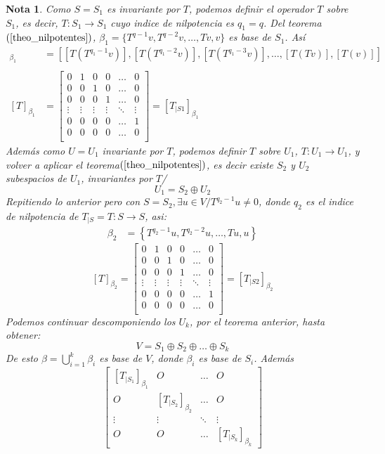 \documentclass[10pt,a4paper]{article}
\newtheorem{mynote}{Nota}
\begin{document}
\begin{mynote}
	Como $S = S_{1}$ es invariante por $T$, podemos definir el operador $T$ sobre $S_{1}$, es decir, $T:S_{1}\rightarrow S_{1}$ cuyo indice de nilpotencia es $q_{1} = q$.
Del teorema $(\ref{theo_nilpotentes})$, $\beta_{1} = \{T^{q-1}v, T^{q-2}v,\ldots,Tv, v\}$ es base de $S_{1}$.
Así 
\begin{align*}
	[T]_{\beta_{1}} &= 
	\left[
	\left[T\left(T^{q_{1}-1}v\right)\right], 
	\left[T\left(T^{q_{1}-2}v\right)\right],
	\left[T\left(T^{q_{1}-3}v\right)\right],
	\ldots,
	\left[T\left(Tv\right)\right],
	\left[T\left(v\right)\right]	
	\right]\\\\
	[T]_{\beta_{1}} &= 
	\begin{bmatrix}
		0	&	1	&	0	&	0	&	\ldots	&	0\\
		0	&	0	&	1	&	0	&	\ldots	&	0\\
		0	&	0	&	0	&	1	&	\ldots	&	0\\
		\vdots	&	\vdots	&	\vdots	&	\vdots	&	\ddots	&	\vdots\\
		0	&	0	&	0	&	0	&	\ldots	&	1\\
		0	&	0	&	0	&	0	&	\ldots	&	0\\
	\end{bmatrix} = [T_{|S1}]_{\beta_{1}}
\end{align*}
Además como $U = U_{1}$ invariante por $T$, podemos definir $T$ sobre $U_{1}$, $T: U_{1}\rightarrow U_{1}$, y volver a aplicar el \textit{teorema}$(\ref{theo_nilpotentes})$, es decir existe $S_{2}$ y $U_{2}$ subespacios de $U_{1}$, invariantes por $T$/
$$U_{1} = S_{2}\oplus U_{2}$$
Repitiendo lo anterior pero con $S = S_{2},\exists u\in V/T^{q_{2}-1}u\neq 0$, donde $q_{2}$ es el indice de nilpotencia de $T_{|S} = T:S\rightarrow S$, asi:
\begin{align*}
	\beta_{2} &= \left\{T^{q_{2}-1}u, T^{q_{2}-2}u,\ldots,Tu, u\right\}
\end{align*}
$$[T]_{\beta_{2}} = 
\begin{bmatrix}
	0	&	1	&	0	&	0	&	\ldots	&	0\\
	0	&	0	&	1	&	0	&	\ldots	&	0\\
	0	&	0	&	0	&	1	&	\ldots	&	0\\
	\vdots	&	\vdots	&	\vdots	&	\vdots	&	\ddots	&	\vdots\\
	0	&	0	&	0	&	0	&	\ldots	&	1\\
	0	&	0	&	0	&	0	&	\ldots	&	0\\
\end{bmatrix} = [T_{|S2}]_{\beta_{2}}$$
$$$$
Podemos continuar descomponiendo los $U_{k}$, por el teorema anterior, hasta obtener:
$$V = S_{1}\oplus S_{2}\oplus \ldots \oplus S_{k}$$
De esto $\beta = \bigcup_{i=1}^{k}\beta_{i}$ es base de $V$, donde $\beta_{i}$ es base de $S_{i}$.
Además
$$\begin{bmatrix}
	\left[T_{|S_{1}}\right]_{\beta_{1}}	&	O	&	\ldots	&	O\\
	O	&	\left[T_{|S_{2}}\right]_{\beta_{2}}	&	\ldots	&	O\\
	\vdots	&	\vdots	& \ddots	& \vdots\\
	O	&	O	&	\ldots	&	\left[T_{|S_{k}}\right]_{\beta_{k}}
\end{bmatrix}$$


\end{mynote}
\end{document}
